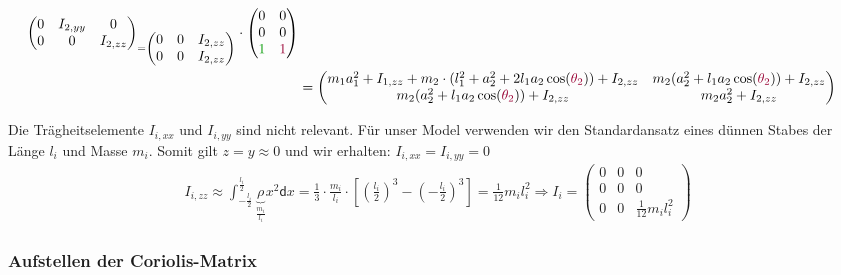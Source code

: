 \documentclass[a4paper, 12pt]{scrartcl}
\newcommand{\gruen}[2][gruen]{\textcolor{#1}{#2}}
\newcommand{\dunkelrot}[2][dunkelrot]{\textcolor{#1}{#2}}
\begin{document}
\begin{align*}
{\begin{pmatrix}
            0 & I_{2,yy} & 0 \\
            0 & 0 & I_{2,zz}
        \end{pmatrix}}_{
        = 
        \begin{pmatrix}
            0 & 0 & I_{2,zz} \\
            0 & 0 & I_{2,zz}
        \end{pmatrix}
    }   
    \cdot
    \begin{pmatrix}
        0 & 0 \\
        0 & 0 \\
        \gruen{1} & \dunkelrot{1}
    \end{pmatrix}
    \\
    &=
    \begin{pmatrix}
        m_1 a_1^2 + I_{1,zz} + m_2 \cdot (l_1^2 + a_2^2 + 2 l_1 a_2  \cos(\dunkelrot{\theta_{2}})) + I_{2,zz}
        & m_2 (a_2^2 + l_1 a_2  \cos(\dunkelrot{\theta_{2}})) +I_{2,zz}  \\
        m_2 (a_2^2 + l_1 a_2  \cos(\dunkelrot{\theta_{2}})) + I_{2,zz}
        & m_2 a_2^2 +I_{2,zz} 
    \end{pmatrix}
\end{align*}

Die Trägheitselemente $I_{i,xx}$ und $I_{i,yy}$ sind nicht relevant.
Für unser Model verwenden wir den Standardansatz eines 
dünnen Stabes der Länge $l_i$ und Masse $m_i$. 
Somit gilt $z= y \approx 0$ und wir erhalten: $I_{i,xx} = I_{i,yy} =0$
\begin{align*}
    I_{i,zz} \approx \int_{-\frac{l_{i}}{2}}^{\frac{l_{i}}{2}} 
    \underbrace{\rho}_{\frac{m_{i}}{l_{i}}} x^2 \mathsf{d}x
    = \frac{1}{3} \cdot \frac{m_{i}}{l_{i}} 
    \cdot 
    \left[ 
        \left( \frac{l_{i}}{2} \right)^3 -  \left( -\frac{l_{i}}{2} \right)^3 
    \right]
    = \frac{1}{12} m_{i} l_{i}^{2}
    \Rightarrow
    I_i     
    = 
    \begin{pmatrix}
        0 & 0 & 0 \\
        0 & 0 & 0 \\
        0 & 0 & \frac{1}{12} m_{i} l_{i}^{2}
    \end{pmatrix}
\end{align*}


\subsubsection{Aufstellen der Coriolis-Matrix}
\end{document}
